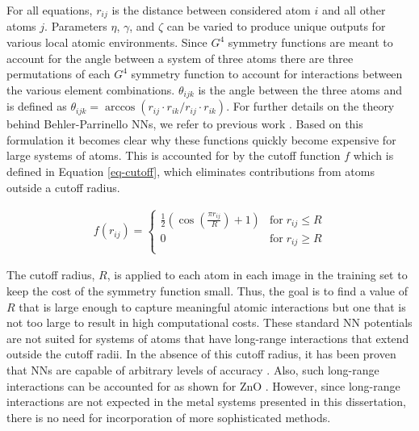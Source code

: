 \documentclass[12pt]{cmuthesis}
\begin{document}
For all equations, \(r_{ij}\) is the distance between considered atom \(i\) and all other atoms \(j\). Parameters \(\eta\), \(\gamma\), and \(\zeta\) can be varied to produce unique outputs for various local atomic environments. Since \(G^{4}\) symmetry functions are meant to account for the angle between a system of three atoms there are three permutations of each \(G^{4}\) symmetry function to account for interactions between the various element combinations. \(\theta_{ijk}\) is the angle between the three atoms and is defined as \(\theta_{ijk} = \arccos(r_{ij} \cdot r_{ik} / r_{ij} \cdot r_{ik})\). For further details on the theory behind Behler-Parrinello NNs, we refer to previous work \cite{behler-2007-gener-neural,behler-2011-atom}. Based on this formulation it becomes clear why these functions quickly become expensive for large systems of atoms. This is accounted for by the cutoff function \(f\) which is defined in Equation \ref{eq-cutoff}, which eliminates contributions from atoms outside a cutoff radius.

\begin{eqnarray} \label{eq-cutoff}
f(r_{ij}) =
\begin{cases}
\frac{1}{2} \left(\cos\left(\frac{\pi r_{ij}}{R}\right) +1\right) & \textrm{for} \; r_{ij} \leq R \\
0 & \textrm{for} \; r_{ij} \geq R \\
\end{cases}
\end{eqnarray}

The cutoff radius, \(R\), is applied to each atom in each image in the training set to keep the cost of the symmetry function small. Thus, the goal is to find a value of \(R\) that is large enough to capture meaningful atomic interactions but one that is not too large to result in high computational costs. These standard NN potentials are not suited for systems of atoms that have long-range interactions that extend outside the cutoff radii. In the absence of this cutoff radius, it has been proven that NNs are capable of arbitrary levels of accuracy \cite{hornik-1989-multil}. Also, such long-range interactions can be accounted for as shown for ZnO \cite{artrith-2011-high}. However, since long-range interactions are not expected in the metal systems presented in this dissertation, there is no need for incorporation of more sophisticated methods.
\end{document}
